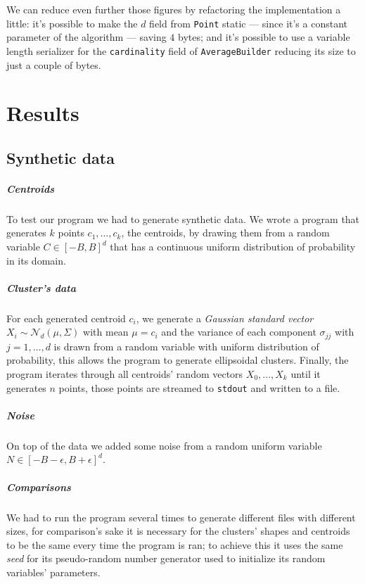\documentclass[parskip=full]{report}
\begin{document}
We can reduce even further those figures by refactoring the implementation a 
little: it's possible to make the $d$ field from \texttt{Point} static --- 
since it's a constant parameter of the algorithm --- saving $4$ bytes; and it's 
possible to use a variable length serializer for the \texttt{cardinality} field 
of \texttt{AverageBuilder} reducing its size to just a couple of bytes.

\chapter{Results}

\section{Synthetic data}

\paragraph{Centroids}
To test our program we had to generate synthetic data. We wrote a program that 
generates $k$ points $c_1, \dots, c_k$, the centroids, by drawing them from a 
random variable 
$C \in \left[-B,B\right]^d$ that has a continuous uniform distribution of 
probability in its domain.

\paragraph{Cluster's data}
For each generated centroid $c_i$, we generate a \emph{Gaussian standard 
vector} $X_i \sim \mathcal{N}_d(\mu, \Sigma)$ with mean $\mu = c_i$ and the 
variance of each component 
$\sigma_{jj}$ with $j = 1, \dots, d$ is 
drawn from a random variable with uniform distribution of probability, this 
allows the program to generate ellipsoidal clusters. Finally, the program 
iterates through all centroids' random vectors $X_0, ..., X_k$ until it 
generates $n$ points, those points are streamed to \texttt{stdout} and written 
to a file.

\paragraph{Noise}
On top of the data we added some noise from a random uniform variable $N \in \left[-B - 	\epsilon, B + \epsilon\right]^d$.

\paragraph{Comparisons}
We had to run the program several times to generate different files with 
different sizes, for comparison's sake it is necessary for the clusters' shapes 
and centroids to be the same every time the program is ran; to achieve this it 
uses the same  \emph{seed} for its pseudo-random number generator used to 
initialize its random variables' parameters.
\end{document}
